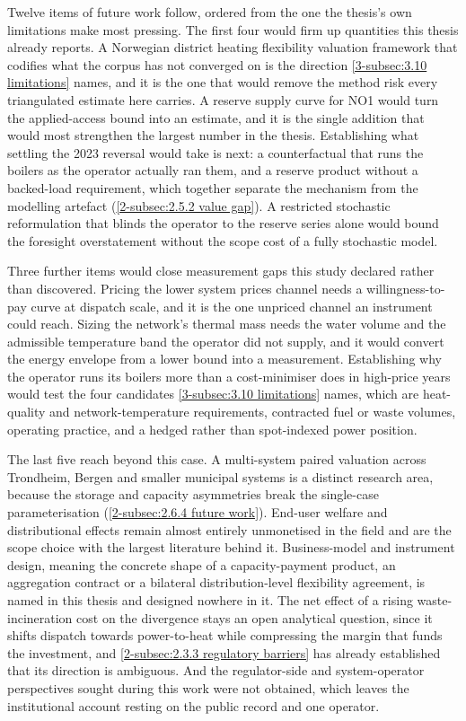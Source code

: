 Twelve items of future work follow, ordered from the one the thesis's own limitations make most pressing. The first four would firm up quantities this thesis already reports. A Norwegian district heating flexibility valuation framework that codifies what the corpus has not converged on is the direction \autoref{3-subsec:3.10 limitations} names, and it is the one that would remove the method risk every triangulated estimate here carries. A reserve supply curve for NO1 would turn the applied-access bound into an estimate, and it is the single addition that would most strengthen the largest number in the thesis. Establishing what settling the 2023 reversal would take is next: a counterfactual that runs the boilers as the operator actually ran them, and a reserve product without a backed-load requirement, which together separate the mechanism from the modelling artefact (\autoref{2-subsec:2.5.2 value gap}). A restricted stochastic reformulation that blinds the operator to the reserve series alone would bound the foresight overstatement without the scope cost of a fully stochastic model.

Three further items would close measurement gaps this study declared rather than discovered. Pricing the lower system prices channel needs a willingness-to-pay curve at dispatch scale, and it is the one unpriced channel an instrument could reach. Sizing the network's thermal mass needs the water volume and the admissible temperature band the operator did not supply, and it would convert the energy envelope from a lower bound into a measurement. Establishing why the operator runs its boilers more than a cost-minimiser does in high-price years would test the four candidates \autoref{3-subsec:3.10 limitations} names, which are heat-quality and network-temperature requirements, contracted fuel or waste volumes, operating practice, and a hedged rather than spot-indexed power position.

The last five reach beyond this case. A multi-system paired valuation across Trondheim, Bergen and smaller municipal systems is a distinct research area, because the storage and capacity asymmetries break the single-case parameterisation (\autoref{2-subsec:2.6.4 future work}). End-user welfare and distributional effects remain almost entirely unmonetised in the field and are the scope choice with the largest literature behind it. Business-model and instrument design, meaning the concrete shape of a capacity-payment product, an aggregation contract or a bilateral distribution-level flexibility agreement, is named in this thesis and designed nowhere in it. The net effect of a rising waste-incineration cost on the divergence stays an open analytical question, since it shifts dispatch towards power-to-heat while compressing the margin that funds the investment, and \autoref{2-subsec:2.3.3 regulatory barriers} has already established that its direction is ambiguous. And the regulator-side and system-operator perspectives sought during this work were not obtained, which leaves the institutional account resting on the public record and one operator.

